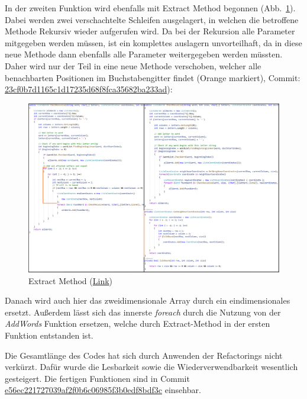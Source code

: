 In der zweiten Funktion wird ebenfalls mit Extract Method begonnen (Abb.~\ref{Abb:ExtractMethod2}). Dabei werden zwei verschachtelte Schleifen ausgelagert, in welchen die betroffene Methode Rekursiv wieder aufgerufen wird. Da bei der Rekursion alle Parameter mitgegeben werden müssen, ist ein komplettes auslagern unvorteilhaft, da in diese neue Methode dann ebenfalls alle Parameter weitergegeben werden müssten. Daher wird nur der Teil in eine neue Methode verschoben, welcher alle benachbarten Positionen im Buchstabengitter findet (Orange markiert), Commit: \href{https://github.com/EinToni/Wortfinder/commit/23cf0b7d1165c1d17235d68f8fca35682ba233ad}{23cf0b7d1165c1d17235d68f8fca35682ba233ad}):
\newpage
\begin{figure}[!ht]
  \centering
  \includegraphics[width=\textwidth]{Bilder/ExtractMethod2.PNG}
  \caption[Extract Method]{Extract Method (\href{https://github.com/EinToni/WortfinderDoku/blob/main/Bilder/ExtractMethod2.png}{Link})}
  \label{Abb:ExtractMethod2}
\end{figure}

Danach wird auch hier das zweidimensionale Array durch ein eindimensionales ersetzt. Außerdem lässt sich das innerste \textit{foreach} durch die Nutzung von der \textit{AddWords} Funktion ersetzen, welche durch Extract-Method in der ersten Funktion entstanden ist. 


Die Gesamtlänge des Codes hat sich durch Anwenden der Refactorings nicht verkürzt. Dafür wurde die Lesbarkeit sowie die Wiederverwendbarkeit wesentlich gesteigert. Die fertigen Funktionen sind in Commit \href{https://github.com/EinToni/Wortfinder/commit/e56ec221727039af2f0b6c06985f3b0edf8bdf3c}{e56ec221727039af2f0b6c06985f3b0edf8bdf3c} einsehbar.

